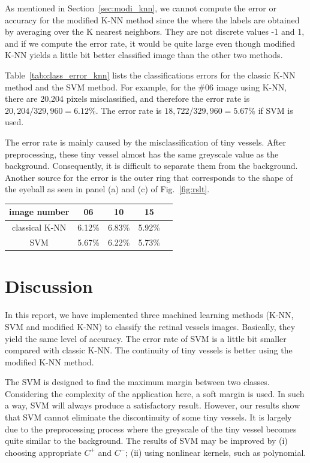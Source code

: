 \documentclass[12pt, notitlepage]{article}
\newcommand{\fref}[1]{Fig.~\ref{#1}}
\newcommand{\tabref}[1]{Table~\ref{#1}}
\begin{document}
As mentioned in Section~\ref{sec:modi_knn}, we cannot compute the error or accuracy for the modified K-NN method since the where the labels are obtained by averaging over the K nearest neighbors. They are not discrete values -1 and 1, and if we compute the error rate, it would be quite large even though modified K-NN yields a little bit better classified image than the other two methods. 


\tabref{tab:class_error_knn} lists the classifications errors for the classic K-NN method and the SVM method.  For example, for the $\#06$ image using K-NN, there are 20,204 pixels misclassified, and therefore the error rate is $20,204/329,960= 6.12\%$. The error rate is $18,722/329,960 = 5.67\%$ if SVM is used. 

The error rate is mainly caused by the misclassification of tiny vessels. After preprocessing, these tiny vessel almost has the same greyscale value as the background. Consequently, it is difficult to separate them from the background. Another source for the error is the outer ring that corresponds to the shape of the eyeball as seen in panel (a) and (c) of \fref{fig:rslt}. 

\begin{center}
\label{tab:class_error_knn}
\begin{tabular}{c c c c c}
\hline
\hline
image number          & 06   &   10  &  15     \\
\hline
classical K-NN  & 6.12\%  &6.83\% & 5.92\%    \\
SVM             & 5.67\%  &6.22\% & 5.73\%    \\
\hline
\hline
\end{tabular}
\end{center}


\section{Discussion}

In this report, we have implemented three machined learning methods (K-NN, SVM and modified K-NN) to classify the retinal vessels images. Basically, they yield the same level of accuracy. The error rate of SVM is a little bit smaller compared with classic K-NN.  The continuity of tiny vessels is better using the modified K-NN method.   

The SVM is designed to find the maximum margin between two classes. Considering the complexity of the application here, a soft margin is used.  In such a way, SVM will always produce a satisfactory result. However, our results show that SVM cannot eliminate the discontinuity of some tiny vessels.  It is largely due to the preprocessing process where the greyscale of the tiny vessel becomes quite similar to the background.  The results of SVM may be improved by (i) choosing appropriate $C^+$ and $C^-$; (ii) using nonlinear kernels, such as polynomial.  
\end{document}
